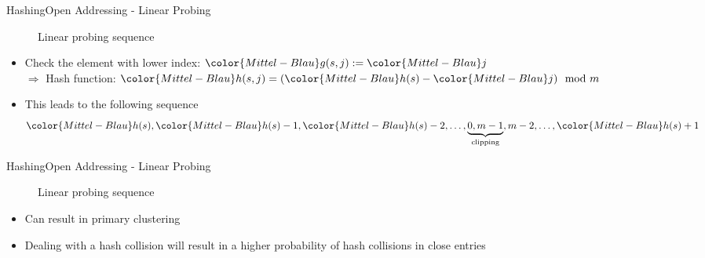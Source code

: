 
\begin{frame}{Hashing}{Open Addressing - Linear Probing}
  \begin{figure}[!h]
    \begin{adjustbox}{width=0.75\linewidth}%
    \end{adjustbox}
    \vspace{-1.0em}
    \caption{Linear probing sequence}%
    \label{fig:hashing:open_addressing:linear_probing}%
  \end{figure}
  \vspace{-1.0em}
  \begin{itemize}
    \item<2->
      Check the element with lower index:
      \begin{math}
        {\color{Mittel-Blau}g(s,j)} := {\color{Mittel-Blau}j}
      \end{math}\\
      $\Rightarrow$ Hash function:
      \begin{math}
        {\color{Mittel-Blau}h(s,j)}
        = ({\color{Mittel-Blau}h(s)} - {\color{Mittel-Blau}j}) \mod m
      \end{math}
    \item<3->
      This leads to the following sequence
      \begin{displaymath}
        {\color{Mittel-Blau}h(s)},
        {\color{Mittel-Blau}h(s)}-1,
        {\color{Mittel-Blau}h(s)}-2,
        \dots,
        \underbrace{0, m-1}_\text{clipping},
        m-2,
        \dots,
        {\color{Mittel-Blau}h(s)}+1
      \end{displaymath}
  \end{itemize}
\end{frame}


\begin{frame}{Hashing}{Open Addressing - Linear Probing}
  \begin{figure}[!h]
    \begin{adjustbox}{width=0.75\linewidth}%
    \end{adjustbox}
    \vspace{-0.5em}
    \caption{Linear probing sequence}%
    \label{fig:hashing:open_addressing:linear_probing2}%
  \end{figure}
  \vspace{-1.5em}
  \begin{itemize}
    \item<2->
      Can result in primary clustering
    \item<3->
      Dealing with a hash collision will result in a higher probability of hash
      collisions in close entries
  \end{itemize}
\end{frame}

